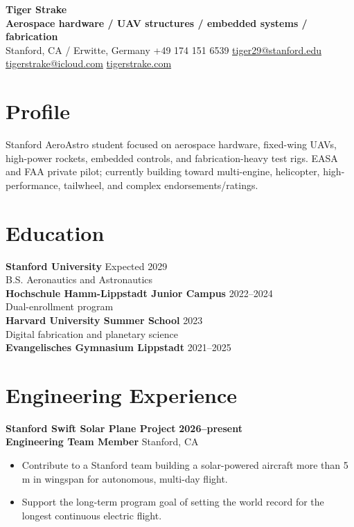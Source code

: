 \documentclass[10pt,letterpaper]{article}
\newcommand{\role}[4]{
  \textbf{#1} \hfill {\color{muted}\textbf{#4}}\\
  {\color{accent}\textbf{#2}} \hfill {\color{muted}#3}
  \vspace{2pt}
}
\begin{document}
{\Huge\bfseries Tiger Strake}\\[3pt]
{\color{accent}\textbf{Aerospace hardware / UAV structures / embedded systems / fabrication}}\\[4pt]
Stanford, CA / Erwitte, Germany \quad
+49 174 151 6539 \quad
\href{mailto:tiger29@stanford.edu}{tiger29@stanford.edu} \quad
\href{mailto:tigerstrake@icloud.com}{tigerstrake@icloud.com} \quad
\href{https://tigerstrake.com}{tigerstrake.com}

\section{Profile}
Stanford AeroAstro student focused on aerospace hardware, fixed-wing UAVs, high-power rockets, embedded controls, and fabrication-heavy test rigs. EASA and FAA private pilot; currently building toward multi-engine, helicopter, high-performance, tailwheel, and complex endorsements/ratings.

\section{Education}
\textbf{Stanford University} \hfill {\color{muted}Expected 2029}\\
B.S. Aeronautics and Astronautics\\[2pt]
\textbf{Hochschule Hamm-Lippstadt Junior Campus} \hfill {\color{muted}2022--2024}\\
Dual-enrollment program\\[2pt]
\textbf{Harvard University Summer School} \hfill {\color{muted}2023}\\
Digital fabrication and planetary science\\[2pt]
\textbf{Evangelisches Gymnasium Lippstadt} \hfill {\color{muted}2021--2025}

\section{Engineering Experience}
\role{Stanford Swift Solar Plane Project}{Engineering Team Member}{Stanford, CA}{2026--present}
\begin{itemize}
  \item Contribute to a Stanford team building a solar-powered aircraft more than 5 m in wingspan for autonomous, multi-day flight.
  \item Support the long-term program goal of setting the world record for the longest continuous electric flight.
\end{itemize}
\end{document}
